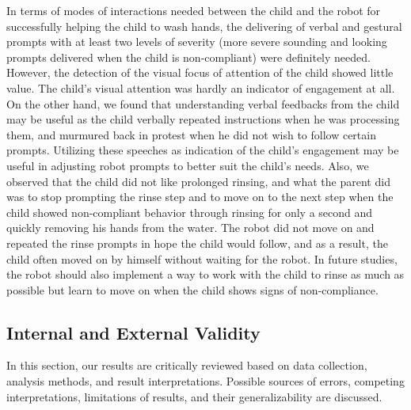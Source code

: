 In terms of modes of interactions needed between the child and the robot for successfully helping the child to wash hands, the delivering of verbal and gestural prompts with at least two levels of severity (more severe sounding and looking prompts delivered when the child is non-compliant) were definitely needed.  However, the detection of the visual focus of attention of the child showed little value.  The child's visual attention was hardly an indicator of engagement at all.  On the other hand, we found that understanding verbal feedbacks from the child may be useful as the child verbally repeated instructions when he was processing them, and murmured back in protest when he did not wish to follow certain prompts.  Utilizing these speeches as indication of the child's engagement may be useful in adjusting robot prompts to better suit the child's needs.  Also, we observed that the child did not like prolonged rinsing, and what the parent did was to stop prompting the rinse step and to move on to the next step when the child showed non-compliant behavior through rinsing for only a second and quickly removing his hands from the water.  The robot did not move on and repeated the rinse prompts in hope the child would follow, and as a result, the child often moved on by himself without waiting for the robot.  In future studies, the robot should also implement a way to work with the child to rinse as much as possible but learn to move on when the child shows signs of non-compliance.


\subsection{Internal and External Validity}
In this section, our results are critically reviewed based on data collection, analysis methods, and result interpretations.  Possible sources of errors, competing interpretations, limitations of results, and their generalizability are discussed.

